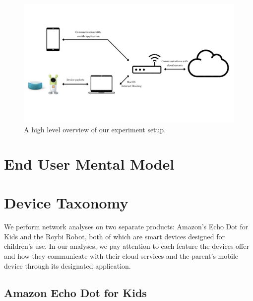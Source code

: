 \documentclass[12pt]{ucthesis}
\begin{document}
\begin{figure}
    \label{fig:experiment}
    \includegraphics[width=\textwidth]{experiment.jpg}
    \caption{A high level overview of our experiment setup.}
\end{figure}

\chapter{End User Mental Model}
\label{ch:mental}


\chapter{Device Taxonomy}
\label{ch:taxonomy}
We perform network analyses on two separate products: Amazon's Echo Dot for Kids and the Roybi Robot, both of which are smart devices designed for children's use. In our analyses, we pay attention to each feature the devices offer and how they communicate with their cloud services and the parent's mobile device through its designated application.

\section{Amazon Echo Dot for Kids}
\end{document}
